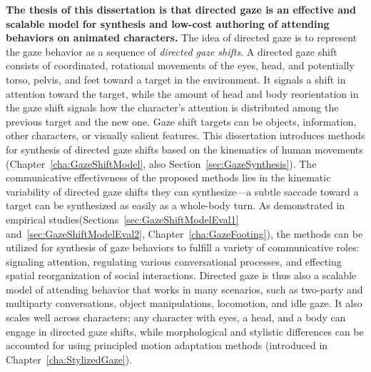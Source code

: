 \textbf{The thesis of this dissertation is that directed gaze is an effective and scalable model for synthesis and low-cost authoring of attending behaviors on animated characters.} The idea of directed gaze is to represent the gaze behavior as a sequence of \emph{directed gaze shifts}. A directed gaze shift consists of coordinated, rotational movements of the eyes, head, and potentially torso, pelvis, and feet toward a target in the environment. It signals a shift in attention toward the target, while the amount of head and body reorientation in the gaze shift signals how the character's attention is distributed among the previous target and the new one. Gaze shift targets can be objects, information, other characters, or visually salient features. This dissertation introduces methods for synthesis of directed gaze shifts based on the kinematics of human movements (Chapter~\ref{cha:GazeShiftModel}, also Section~\ref{sec:GazeSynthesis}). The communicative effectiveness of the proposed methods lies in the kinematic variability of directed gaze shifts they can synthesize---a subtle saccade toward a target can be synthesized as easily as a whole-body turn. As demonstrated in empirical studies(Sections~\ref{sec:GazeShiftModelEval1} and~\ref{sec:GazeShiftModelEval2}, Chapter~\ref{cha:GazeFooting}), the methods can be utilized for synthesis of gaze behaviors to fulfill a variety of communicative roles: signaling attention, regulating various conversational processes, and effecting spatial reorganization of social interactions. Directed gaze is thus also a scalable model of attending behavior that works in many scenarios, such as two-party and multiparty conversations, object manipulations, locomotion, and idle gaze. It also scales well across characters; any character with eyes, a head, and a body can engage in directed gaze shifts, while morphological and stylistic differences can be accounted for using principled motion adaptation methods (introduced in Chapter~\ref{cha:StylizedGaze}).

